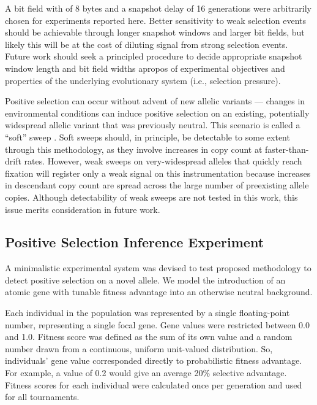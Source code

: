A bit field with of 8 bytes and a snapshot delay of 16 generations were arbitrarily chosen for experiments reported here.
Better sensitivity to weak selection events should be achievable through longer snapshot windows and larger bit fields, but likely this will be at the cost of diluting signal from strong selection events.
Future work should seek a principled procedure to decide appropriate snapshot window length and bit field widths apropos of experimental objectives and properties of the underlying evolutionary system (i.e., selection pressure).

Positive selection can occur without advent of new allelic variants --- changes in environmental conditions can induce positive selection on an existing, potentially widespread allelic variant that was previously neutral.
This scenario is called a ``soft'' sweep \citep{hermisson2005soft}.
Soft sweeps should, in principle, be detectable to some extent through this methodology, as they involve increases in copy count at faster-than-drift rates.
However, weak sweeps on very-widespread alleles that quickly reach fixation will register only a weak signal on this instrumentation because increases in descendant copy count are spread across the large number of preexisting allele copies.
Although detectability of weak sweeps are not tested in this work, this issue merits consideration in future work.

\subsection{Positive Selection Inference Experiment}
\label{sec:positive-selection-inference-experiment}

A minimalistic experimental system was devised to test proposed methodology to detect positive selection on a novel allele.
We model the introduction of an atomic gene with tunable fitness advantage into an otherwise neutral background.

Each individual in the population was represented by a single floating-point number, representing a single focal gene.
Gene values were restricted between 0.0 and 1.0.
Fitness score was defined as the sum of its own value and a random number drawn from a continuous, uniform unit-valued distribution.
So, individuals' gene value corresponded directly to probabilistic fitness advantage.
For example, a value of 0.2 would give an average 20\% selective advantage.
Fitness scores for each individual were calculated once per generation and used for all tournaments.

